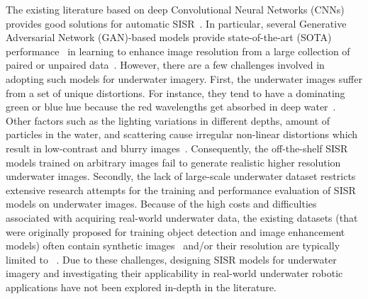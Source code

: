\documentclass[10pt,twocolumn,letterpaper]{article}
\begin{document}
The existing literature based on deep Convolutional Neural Networks (CNNs) provides good solutions for automatic SISR~\cite{dong2015image,lim2017enhanced}.  
In particular, several Generative Adversarial Network (GAN)-based models provide state-of-the-art (SOTA) performance~\cite{wang2018esrgan,ledig2017photo} in learning to enhance image resolution from a large collection of paired or unpaired data~\cite{yuan2018unsupervised}. 
However, there are a few challenges involved in adopting such models for underwater imagery. First, the underwater images suffer from a set of unique distortions. For instance, they tend to have a dominating green or blue hue because the red wavelengths get absorbed in deep water~\cite{fabbri2018enhancing}. Other factors such as the lighting variations in different depths, amount of particles in the water, and scattering cause irregular non-linear distortions which result in low-contrast and blurry images~\cite{islam2019fast}.
Consequently, the off-the-shelf SISR models trained on arbitrary images fail to generate realistic higher resolution underwater images.
Secondly, the lack of large-scale underwater dataset restricts extensive research attempts for the training and performance evaluation of SISR models on underwater images. 
Because of the high costs and difficulties associated with acquiring real-world underwater data, the existing datasets (that were originally proposed for training object detection and image enhancement models) often contain synthetic images~\cite{fabbri2018enhancing} and/or their resolution are typically limited to ~\cite{islam2019fast}. 
Due to these challenges, designing SISR models for underwater imagery and investigating their applicability in real-world underwater robotic applications have not been explored in-depth in the literature. 
\end{document}
